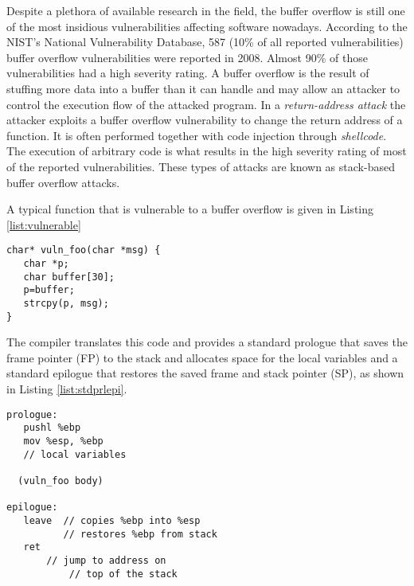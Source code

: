 Despite a plethora of available research in the field, the buffer overflow is still one of the most insidious vulnerabilities affecting software nowadays. According to the NIST's National Vulnerability Database\cite{nist}, 587 (10\% of all reported vulnerabilities) buffer overflow vulnerabilities were reported in 2008. Almost 90\% of those vulnerabilities had a high severity rating.
A buffer overflow is the result of stuffing more data into a buffer than it can handle and may allow an attacker to control the execution flow of the attacked program. In a \emph{return-address attack} the attacker exploits a buffer overflow vulnerability to change the return address of a function. It is often performed together with code injection through \emph{shellcode}. 
The execution of arbitrary code is what results in the high severity rating of most of the reported vulnerabilities. These types of attacks are known as stack-based buffer overflow attacks.

A typical function that is vulnerable to a buffer overflow is given in Listing \ref{list:vulnerable}

\begin{lstlisting}[caption=A function that is vulnerable to buffer overflow, label= list:vulnerable]
char* vuln_foo(char *msg) {
   char *p;
   char buffer[30];
   p=buffer;
   strcpy(p, msg);
}
\end{lstlisting}    
\vspace{5mm}

The compiler translates this code and provides a standard prologue that saves the frame pointer (FP) to the stack and allocates space for the local variables and a standard epilogue that restores the saved frame and stack pointer (SP), as shown in Listing \ref{list:stdprlepi}.


\begin{lstlisting}[caption=The standard prologue and epilogue of vuln\_foo(), label= list:stdprlepi]
prologue:
   pushl %ebp
   mov %esp, %ebp
   // local variables
   
  (vuln_foo body)

epilogue:
   leave  // copies %ebp into %esp
     	  // restores %ebp from stack
   ret
	   // jump to address on 
           // top of the stack
\end{lstlisting}    
\vspace{5mm}

